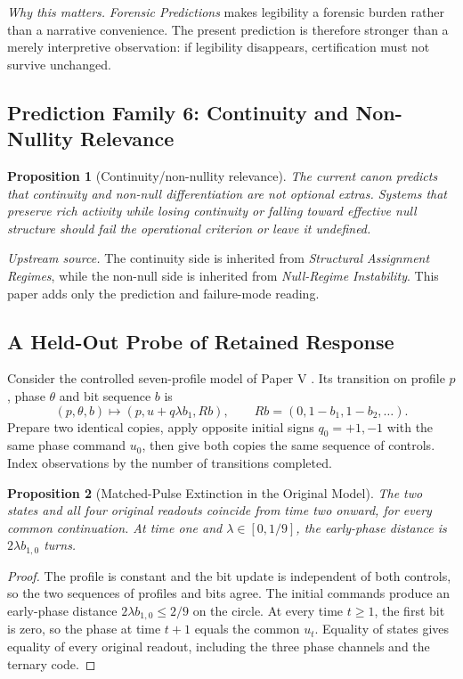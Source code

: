 \documentclass[11pt,a4paper]{article}
\newtheorem{proposition}{Proposition}[section]
\begin{document}
\noindent\textit{Why this matters.} \textit{Forensic Predictions} makes legibility a forensic burden rather than a narrative convenience. The present prediction is therefore stronger than a merely interpretive observation: if legibility disappears, certification must not survive unchanged.

\subsection{Prediction Family 6: Continuity and Non-Nullity Relevance}
\begin{proposition}[Continuity/non-nullity relevance]
The current canon predicts that continuity and non-null differentiation are not optional extras. Systems that preserve rich activity while losing continuity or falling toward effective null structure should fail the operational criterion or leave it undefined.
\end{proposition}

\noindent\textit{Upstream source.} The continuity side is inherited from \textit{Structural Assignment Regimes}, while the non-null side is inherited from \textit{Null-Regime Instability}. This paper adds only the prediction and failure-mode reading.

\subsection{A Held-Out Probe of Retained Response}

Consider the controlled seven-profile model of Paper V \cite{paper5}. Its transition on profile $p$, phase $\theta$ and bit sequence $b$ is
\[
 (p,\theta,b)\longmapsto(p,u+q\lambda b_1,Rb),\qquad
 Rb=(0,1-b_1,1-b_2,\ldots).
\]
Prepare two identical copies, apply opposite initial signs $q_0=+1,-1$ with the same phase command $u_0$, then give both copies the same sequence of controls. Index observations by the number of transitions completed.

\begin{proposition}[Matched-Pulse Extinction in the Original Model]\label{prop:matched-pulse-extinction}
The two states and all four original readouts coincide from time two onward, for every common continuation. At time one and $\lambda\in[0,1/9]$, the early-phase distance is $2\lambda b_{1,0}$ turns.
\end{proposition}
\begin{proof}
The profile is constant and the bit update is independent of both controls, so the two sequences of profiles and bits agree. The initial commands produce an early-phase distance $2\lambda b_{1,0}\le 2/9$ on the circle. At every time $t\ge1$, the first bit is zero, so the phase at time $t+1$ equals the common $u_t$. Equality of states gives equality of every original readout, including the three phase channels and the ternary code.
\end{proof}
\end{document}
